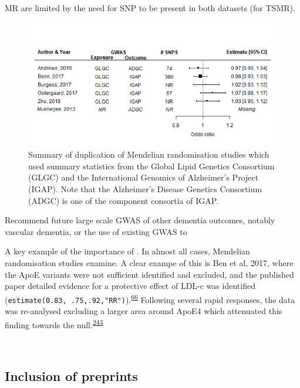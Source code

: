 \documentclass[a4paper, twoside]{templates/ociamthesis}
\begin{document}
MR are limited by the need for SNP to be present in both datasets (for TSMR).





\begin{figure}[H]
\includegraphics[width=1\linewidth]{figures/sys-rev/mrDuplication} \caption[Summary of duplication of Mendelian randomisation studies]{Summary of duplication of Mendelian randomisation studies which used summary statistics from the Global Lipid Genetics Consortium (GLGC) and the International Genomics of Alzheimer's Project (IGAP). Note that the Alzheimer's Disease Genetics Consortium (ADGC) is one of the component consortia of IGAP.}\label{fig:mrDuplication}
\end{figure}

Recommend future large scale GWAS of other dementia outcomes, notably vascular dementia, or the use of existing GWAS to

A key example of the importance of . In almost all cases, Mendelian randomisation studies examine. A clear exampe of this is Ben et al, 2017, where the ApoE variants were not sufficient identified and excluded, and the published paper detailed evidence for a protective effect of LDL-c was identified (\texttt{estimate(0.83,\ .75,.92,"RR")}).\textsuperscript{\protect\hyperlink{ref-benn2017}{66}} Following several rapid responses, the data was re-analysed excluding a larger area around ApoE4 which attenuated this finding towards the null.\textsuperscript{\protect\hyperlink{ref-benn2017a}{243}}

~

\hypertarget{inclusion-of-preprints}{%
\subsection{Inclusion of preprints}\label{inclusion-of-preprints}}
\end{document}
